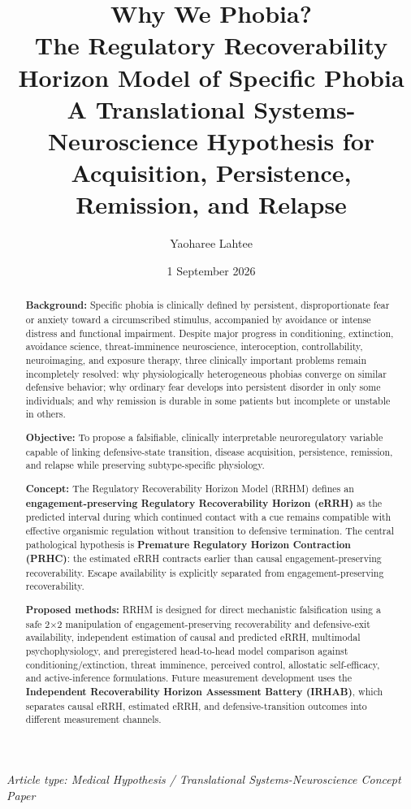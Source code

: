 \documentclass[11pt]{article}
\title{\textbf{Why We Phobia?}\\[0.35em]
\large The Regulatory Recoverability Horizon Model of Specific Phobia\\[0.2em]
\normalsize A Translational Systems-Neuroscience Hypothesis for Acquisition, Persistence, Remission, and Relapse}
\author{Yaoharee Lahtee}
\date{1 September 2026}
\begin{document}
\maketitle

\begin{center}
\textit{Article type: Medical Hypothesis / Translational Systems-Neuroscience Concept Paper}
\end{center}

\begin{abstract}
\textbf{Background:} Specific phobia is clinically defined by persistent, disproportionate fear or anxiety toward a circumscribed stimulus, accompanied by avoidance or intense distress and functional impairment. Despite major progress in conditioning, extinction, avoidance science, threat-imminence neuroscience, interoception, controllability, neuroimaging, and exposure therapy, three clinically important problems remain incompletely resolved: why physiologically heterogeneous phobias converge on similar defensive behavior; why ordinary fear develops into persistent disorder in only some individuals; and why remission is durable in some patients but incomplete or unstable in others.

\textbf{Objective:} To propose a falsifiable, clinically interpretable neuroregulatory variable capable of linking defensive-state transition, disease acquisition, persistence, remission, and relapse while preserving subtype-specific physiology.

\textbf{Concept:} The Regulatory Recoverability Horizon Model (RRHM) defines an \textbf{engagement-preserving Regulatory Recoverability Horizon (eRRH)} as the predicted interval during which continued contact with a cue remains compatible with effective organismic regulation without transition to defensive termination. The central pathological hypothesis is \textbf{Premature Regulatory Horizon Contraction (PRHC)}: the estimated eRRH contracts earlier than causal engagement-preserving recoverability. Escape availability is explicitly separated from engagement-preserving recoverability.

\textbf{Proposed methods:} RRHM is designed for direct mechanistic falsification using a safe 2$\times$2 manipulation of engagement-preserving recoverability and defensive-exit availability, independent estimation of causal and predicted eRRH, multimodal psychophysiology, and preregistered head-to-head model comparison against conditioning/extinction, threat imminence, perceived control, allostatic self-efficacy, and active-inference formulations. Future measurement development uses the \textbf{Independent Recoverability Horizon Assessment Battery (IRHAB)}, which separates causal eRRH, estimated eRRH, and defensive-transition outcomes into different measurement channels.


\end{abstract}
\end{document}
